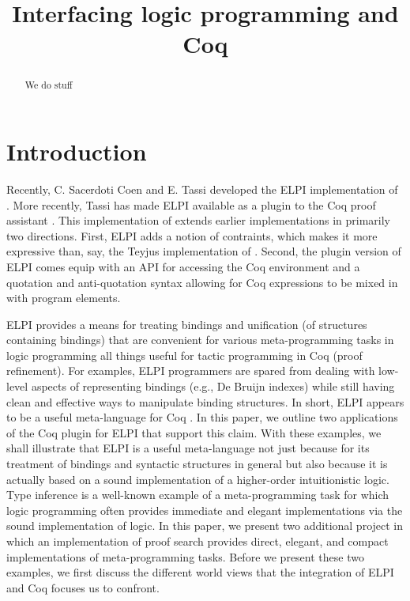 \documentclass[a4paper,USenglish,cleveref, autoref, thm-restate]{lipics-v2019}
\title{Interfacing logic programming and Coq} %
\begin{document}
\maketitle

\begin{abstract}
We do stuff
\end{abstract}

\section{Introduction}
\label{sec:intro}

Recently, C. Sacerdoti Coen and E. Tassi developed the ELPI
implementation \cite{dunchev15lpar} of \lP 
\cite{miller12proghol}.  More recently, Tassi has made ELPI available
as a plugin to the Coq proof assistant \cite{tassi18coqpl}.
%
This implementation of \lP extends earlier implementations in
primarily two directions.  First, ELPI adds a notion of contraints,
which makes it more expressive than, say, the Teyjus implementation of
\lP \cite{nadathur99cade}.  Second, the plugin version of ELPI comes
equip with an API for accessing the Coq environment and a quotation
and anti-quotation syntax allowing for Coq expressions to be mixed in
with \lP program elements.

ELPI provides a means for treating bindings and unification (of
structures containing bindings) that are convenient for various
meta-programming tasks in logic programming all things useful for
tactic programming in Coq (proof refinement).  For examples,
ELPI programmers are spared from dealing with low-level aspects of
representing bindings (e.g., De Bruijn indexes) while still having
clean and effective ways to manipulate binding structures.
%
In short, ELPI appears to be a useful meta-language for Coq
\cite{coen19mscs,tassi18coqpl,tassi19itp}.
%
In this paper, we outline two applications of the Coq plugin for ELPI
that support this claim.
%
With these examples, we shall illustrate that ELPI is a useful
meta-language not just because for its treatment of bindings and
syntactic structures in general but also because it is actually based
on a sound implementation of a higher-order intuitionistic logic.
%
Type inference is a well-known example of a meta-programming task for
which logic programming often provides immediate and elegant
implementations via the sound implementation of logic.
%
In this paper, we present two additional project in which an
implementation of proof search provides direct, elegant, and compact
implementations of meta-programming tasks.
%
Before we present these two examples, we first discuss the different
world views that the integration of ELPI and Coq focuses us to
confront. 
\end{document}
